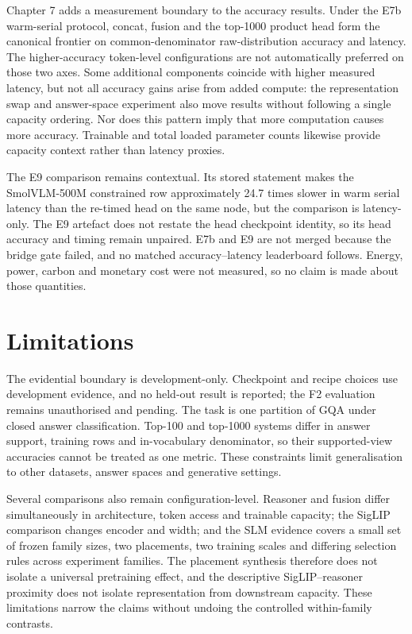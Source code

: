 Chapter 7 adds a measurement boundary to the accuracy results. Under the E7b
warm-serial protocol, concat, fusion and the top-1000 product head form the
canonical frontier on common-denominator raw-distribution accuracy and latency.
The higher-accuracy token-level configurations are not automatically preferred
on those two axes. Some additional components coincide with higher measured
latency, but not all accuracy gains arise from added compute: the representation
swap and answer-space experiment also move results without following a single
capacity ordering. Nor does this pattern imply that more computation causes
more accuracy. Trainable and total loaded parameter counts likewise provide
capacity context rather than latency proxies.

The E9 comparison remains contextual. Its stored statement makes the
SmolVLM-500M constrained row approximately 24.7 times slower in warm serial
latency than the re-timed head on the same node, but the comparison is
latency-only.
The E9 artefact does not restate the head checkpoint identity, so its head
accuracy and timing remain unpaired. E7b and E9 are not merged because the
bridge gate failed, and no matched accuracy--latency leaderboard follows.
Energy, power, carbon and monetary cost were not measured, so no claim is made
about those quantities.

\section{Limitations}
\label{sec:ch8-limitations}

The evidential boundary is development-only. Checkpoint and recipe choices use
development evidence, and no held-out result is reported; the F2 evaluation
remains unauthorised and pending. The task is one partition of GQA under closed
answer classification. Top-100 and top-1000 systems differ in answer support,
training rows and in-vocabulary denominator, so their supported-view
accuracies cannot be treated as one metric. These constraints limit
generalisation to other datasets, answer spaces and generative settings.

Several comparisons also remain configuration-level. Reasoner and fusion
differ simultaneously in architecture, token access and trainable capacity;
the SigLIP comparison changes encoder and width; and the SLM evidence covers a
small set of frozen family sizes, two placements, two training scales and
differing selection rules across experiment families. The placement synthesis
therefore does not isolate a universal pretraining effect, and the descriptive
SigLIP--reasoner proximity does not isolate representation from downstream
capacity. These limitations narrow the claims without undoing the controlled
within-family contrasts.

